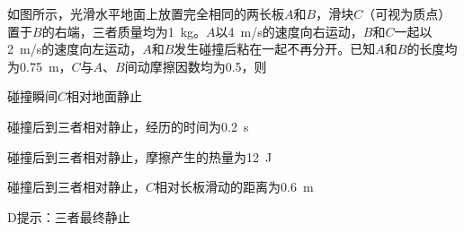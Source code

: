 如图所示，光滑水平地面上放置完全相同的两长板\(A\)和\(B\)，滑块\(C\)（可视为质点）置于\(B\)的右端，三者质量均为\qty{1}{kg}。\(A\)以\qty{4}{m/s}的速度向右运动，\(B\)和\(C\)一起以\qty{2}{m/s}的速度向左运动，\(A\)和\(B\)发生碰撞后粘在一起不再分开。已知\(A\)和\(B\)的长度均为\qty{0.75}{m}，\(C\)与\(A\)、\(B\)间动摩擦因数均为0.5，则\paren[]

\begin{choices}
	\item 碰撞瞬间\(C\)相对地面静止
	\item 碰撞后到三者相对静止，经历的时间为\qty{0.2}{s}
	\item 碰撞后到三者相对静止，摩擦产生的热量为\qty{12}{J}
	\item 碰撞后到三者相对静止，\(C\)相对长板滑动的距离为\qty{0.6}{m}
\end{choices}
\begin{answer}
	D\qquad 提示：三者最终静止
\end{answer}